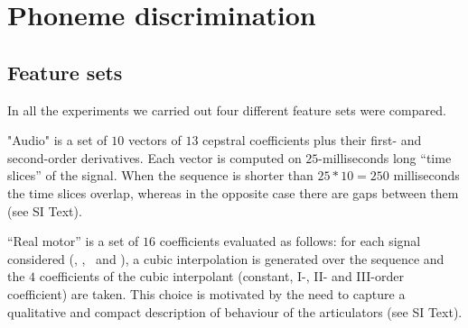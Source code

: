 \section{Phoneme discrimination}
\label{sec:class}

\subsection{Feature sets}
\label{subsec:featset}

In all the experiments we carried out four different feature sets were compared. 

"Audio" is a set of $10$ vectors of $13$ cepstral coefficients plus their first- 
and second-order derivatives. Each vector is computed on $25$-milliseconds long 
``time slices'' of the signal. When the sequence is shorter than $25*10=250$ milliseconds
 the time slices overlap, whereas in the opposite case there are gaps between them (see SI Text).


``Real motor'' is a set of $16$ coefficients evaluated as follows: for each
signal considered (\vlio, \alio, \vttu\ and \attu), a cubic interpolation is generated over 
the sequence and the $4$ coefficients of the cubic interpolant (constant, I-, II- and III-order 
coefficient) are taken. This choice is motivated by the need to capture a qualitative and compact
description of behaviour of the articulators (see SI Text).


